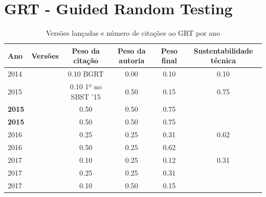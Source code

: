 \section{GRT - Guided Random Testing}


\begin{table}[H]
\caption{Versões lançadas e número de citações ao GRT por ano}
\centering
\begin{tabular}{| l | c | c | c | c | c |}
  \hline
  Ano & Versões & Peso da citação & Peso da autoria & Peso final & Sustentabilidade técnica \\
  \hline
            2014
          &
          
          &
          0.10
            {\tiny BGRT}
          &
          0.00
          &
          0.10
          &
            {\color{red} 0.10}
          \\
\hline
            2015
          &
          
          &
          0.10
            {\tiny 1º no SBST '15}
          &
          0.50
          &
          0.15
          &
            {\color{blue} 0.75}
          \\
            {\bf 2015}
          &
          
          &
          0.50
          &
          0.50
          &
          0.75
          &
          \\
            {\bf 2015}
          &
          
          &
          0.50
          &
          0.50
          &
          0.75
          &
          \\
\hline
            2016
          &
          
          &
          0.25
          &
          0.25
          &
          0.31
          &
            {\color{blue} 0.62}
          \\
            2016
          &
          
          &
          0.50
          &
          0.25
          &
          0.62
          &
          \\
\hline
            2017
          &
          
          &
          0.10
          &
          0.25
          &
          0.12
          &
            {\color{red} 0.31}
          \\
            2017
          &
          
          &
          0.25
          &
          0.25
          &
          0.31
          &
          \\
            2017
          &
          
          &
          0.10
          &
          0.50
          &
          0.15
          &
          \\
\hline
\end{tabular}
\end{table}

